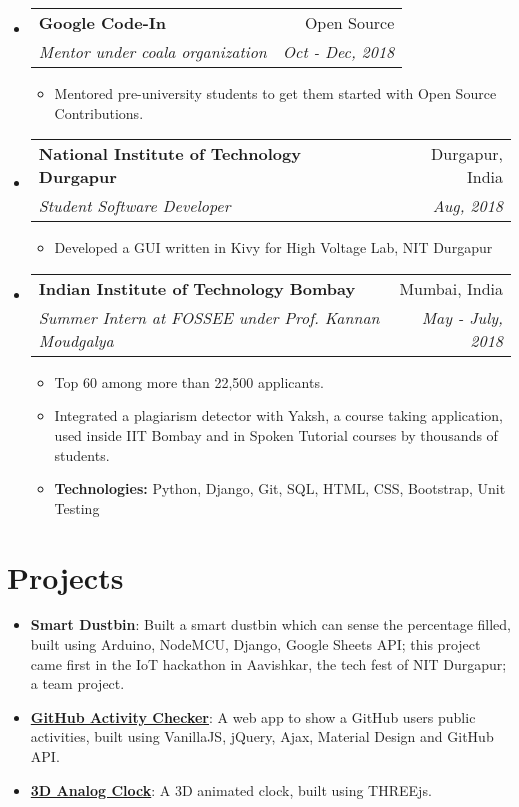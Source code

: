 \documentclass[a4paper,11pt]{article}
\makeatletter
\newcommand{\resumeSubheading}[4]{
  \vspace{-1pt}\item
    \begin{tabular*}{0.97\textwidth}[t]{l@{\extracolsep{\fill}}r}
      \textbf{#1 } & #2 \\
      \textit{\small#3} & \textit{\small #4} \\
    \end{tabular*}\vspace{-5pt}
}
\newcommand{\resumeSubHeadingListStart}{\begin{itemize}[leftmargin=*, topsep=0pt]}
\newcommand{\resumeSubHeadingListEnd}{\end{itemize}}
\newcommand{\resumeItemListStart}{\begin{itemize}}
\newcommand{\resumeItemListEnd}{\end{itemize}\vspace{-5pt}}
\makeatother
\begin{document}
    \resumeSubHeadingListStart
      \resumeSubheading
        {Google Code-In}{Open Source}
        {Mentor under coala organization}{Oct - Dec, 2018}
        \resumeItemListStart
          \item\small
          {Mentored pre-university students to get them started with Open Source Contributions.} %
        \resumeItemListEnd
    \resumeSubHeadingListEnd
    
    \resumeSubHeadingListStart
      \resumeSubheading
      {National Institute of Technology Durgapur}{Durgapur, India}
      {Student Software Developer}{Aug, 2018}
      \resumeItemListStart
        \item\small
        {Developed a GUI written in Kivy for High Voltage Lab, NIT Durgapur}
        \resumeItemListEnd
    \resumeSubHeadingListEnd
    
  \resumeSubHeadingListStart
    \resumeSubheading
    {Indian Institute of Technology Bombay}{Mumbai, India}
    {Summer Intern at FOSSEE under Prof. Kannan Moudgalya}{May - July, 2018}
    \resumeItemListStart
      \item\small
        {Top 60 among more than 22,500 applicants.}
      \item\small
        {Integrated a plagiarism detector with Yaksh, a course taking application, used inside IIT Bombay and in Spoken Tutorial courses by thousands of students.}
      \item\small
      {\textbf{Technologies:} Python, Django, Git, SQL, HTML, CSS, Bootstrap, Unit Testing}
    \resumeItemListEnd
  \resumeSubHeadingListEnd
  
\section{Projects}
      \setlength{\itemsep}{0.5pt}
      \begin{itemize}
        \item\textbf{Smart Dustbin}{: Built a smart dustbin which can sense the percentage filled, built using Arduino, NodeMCU, Django, Google Sheets API; this project came first in the IoT hackathon in Aavishkar, the tech
        fest of NIT Durgapur; a team project.}
        \item\textbf{\href{https://github.com/ayan-b/GitHub-Activity-Checker}{GitHub Activity Checker}}{: A web app to show a GitHub user\textsc{}s public activities, built using VanillaJS, jQuery, Ajax, Material Design and GitHub API.}
        \item\textbf{\href{https://github.com/ayan-b/Analog-Clock-Reading}{3D Analog Clock}}{: A 3D animated clock, built using THREEjs.}
      \end{itemize}
  
\end{document}
